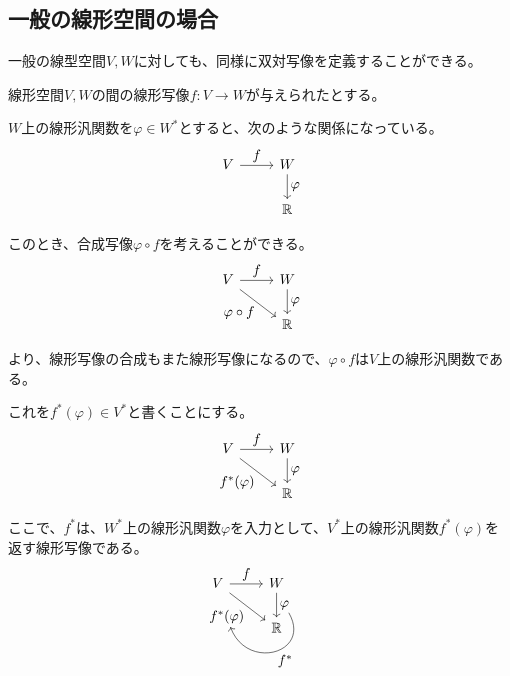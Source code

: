 \documentclass[../../../topic_linear-algebra]{subfiles}
\begin{document}
\subsection{一般の線形空間の場合}

一般の線型空間$V, W$に対しても、同様に双対写像を定義することができる。

\br

線形空間$V,W$の間の線形写像$f \colon V \to W$が与えられたとする。

$W$上の線形汎関数を$\varphi \in W^*$とすると、次のような関係になっている。
\begin{equation*}
  \begin{tikzcd}[every label/.append style = {font = \normalsize}]
    V \arrow[r,"f"] & W \arrow[d,"\varphi"]\\
    & \mathbb{R}
  \end{tikzcd}
\end{equation*}

このとき、合成写像$\varphi \circ f$を考えることができる。
\begin{equation*}
  \begin{tikzcd}[every label/.append style = {font = \normalsize}]
    V \arrow[r,"f"]\arrow[rd, "\varphi \circ f"'] & W \arrow[d,"\varphi"]\\
    & \mathbb{R}
  \end{tikzcd}
\end{equation*}

より、線形写像の合成もまた線形写像になるので、$\varphi \circ f$は$V$上の線形汎関数である。

これを$f^*(\varphi) \in V^*$と書くことにする。
\begin{equation*}
  \begin{tikzcd}[every label/.append style = {font = \normalsize}]
    V \arrow[r,"f"]\arrow[rd, "f^*(\varphi)"'] & W \arrow[d,"\varphi"]\\
    & \mathbb{R}
  \end{tikzcd}
\end{equation*}

ここで、$f^*$は、$W^*$上の線形汎関数$\varphi$を入力として、$V^*$上の線形汎関数$f^*(\varphi)$を返す線形写像である。
\begin{equation*}
  \begin{tikzcd}[every label/.append style = {font = \normalsize}]
    V \arrow[r,"f"]\arrow[rd, "f^*(\varphi)"'{name=v}] & W \arrow[d,"\varphi"{name=w}] \arrow[from=w,to=v,out=-60, in=-70,looseness=2,"f^*"]\\
    & \mathbb{R}
  \end{tikzcd}
\end{equation*}
\end{document}
